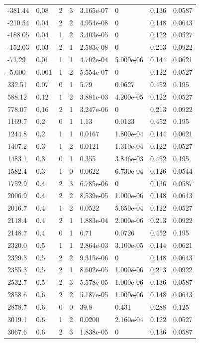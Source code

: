 \documentclass[preview]{standalone}
\begin{document}
{{\begin{tabular}{L{1.2cm}C{1.2cm} C{0.3cm}C{0.5cm} C{1.4cm}C{1.4cm} C{1.4cm}C{1.4cm}}
  -381.44  &  0.08  & 2     &  3 &  3.165e-07  & 0  & 0.136 &  0.0587   \\ 
  -210.54  &  0.04  & 2     &  2 &  4.954e-08  & 0  & 0.148 &  0.0643   \\ 
  -188.05  &  0.04  & 1     &  2 &  3.403e-05  & 0  & 0.122 &  0.0527   \\ 
  -152.03  &  0.03  & 2     &  1 &  2.583e-08  & 0  & 0.213 &  0.0922   \\ 
  -71.29  &  0.01  & 1     &  1 &  4.702e-04  & 5.000e-06  & 0.144 &  0.0621   \\ 
  -5.000  &  0.001  & 1     &  2 &  5.554e-07  & 0  & 0.122 &  0.0527   \\ 
  332.51  &  0.07  & 0     &  1 &  5.79  & 0.0627  & 0.452 &  0.195   \\ 
  588.12  &  0.12  & 1     &  2 &  3.881e-03  & 4.200e-05  & 0.122 &  0.0527   \\ 
  778.07  &  0.16  & 2     &  1 &  3.247e-06  & 0  & 0.213 &  0.0922   \\ 
  1169.7  &   0.2  & 0     &  1 &  1.13  & 0.0123  & 0.452 &  0.195   \\ 
  1244.8  &   0.2  & 1     &  1 &  0.0167  & 1.800e-04  & 0.144 &  0.0621   \\ 
  1407.2  &   0.3  & 1     &  2 &  0.0121  & 1.310e-04  & 0.122 &  0.0527   \\ 
  1483.1  &   0.3  & 0     &  1 &  0.355  & 3.846e-03  & 0.452 &  0.195   \\ 
  1582.4  &   0.3  & 1     &  0 &  0.0622  & 6.730e-04  & 0.126 &  0.0544   \\ 
  1752.9  &   0.4  & 2     &  3 &  6.785e-06  & 0  & 0.136 &  0.0587   \\ 
  2006.9  &   0.4  & 2     &  2 &  8.539e-05  & 1.000e-06  & 0.148 &  0.0643   \\ 
  2016.7  &   0.4  & 1     &  2 &  0.0522  & 5.650e-04  & 0.122 &  0.0527   \\ 
  2118.4  &   0.4  & 2     &  1 &  1.883e-04  & 2.000e-06  & 0.213 &  0.0922   \\ 
  2148.7  &   0.4  & 0     &  1 &  6.71  & 0.0726  & 0.452 &  0.195   \\ 
  2320.0  &   0.5  & 1     &  1 &  2.864e-03  & 3.100e-05  & 0.144 &  0.0621   \\ 
  2329.5  &   0.5  & 2     &  2 &  9.315e-06  & 0  & 0.148 &  0.0643   \\ 
  2355.3  &   0.5  & 2     &  1 &  8.602e-05  & 1.000e-06  & 0.213 &  0.0922   \\ 
  2532.7  &   0.5  & 2     &  3 &  5.578e-05  & 1.000e-06  & 0.136 &  0.0587   \\ 
  2858.6  &   0.6  & 2     &  2 &  5.187e-05  & 1.000e-06  & 0.148 &  0.0643   \\ 
  2878.7  &   0.6  & 0     &  0 &  39.8  & 0.431  & 0.288 &  0.125   \\ 
  3019.1  &   0.6  & 1     &  2 &  0.0200  & 2.160e-04  & 0.122 &  0.0527   \\ 
  3067.6  &   0.6  & 2     &  3 &  1.838e-05  & 0  & 0.136 &  0.0587   \\ 
\hline 
\end{tabular} 

}}
\end{document}
